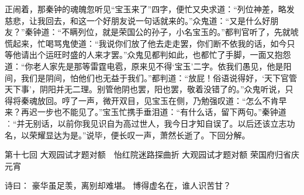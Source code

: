 \documentclass[12pt,oneside]{book}
\begin{document}
正闹着，那秦钟的魂魄忽听见“宝玉来了”四字，便忙又央求道：“列位神差，略发慈悲，让我回去，和这一个好朋友说一句话就来的。”众鬼道：“又是什么好朋友？”秦钟道：“不瞒列位，就是荣国公的孙子，小名宝玉的。”都判官听了，先就唬慌起来，忙喝骂鬼使道：“我说你们放了他去走走罢，你们断不依我的话，如今只等他请出个运旺时盛的人来才罢。”众鬼见都判如此，也都忙了手脚，一面又抱怨道：“你老人家先是那等雷霆电雹，原来见不得‘宝玉’二字。依我们愚见，他是阳间，我们是阴间，怕他们也无益于我们。”都判道：“放屁！俗语说得好，‘天下官管天下事’，阴阳并无二理。别管他阴也罢，阳也罢，敬着没错了的。”众鬼听说，只得将秦魂放回。哼了一声，微开双目，见宝玉在侧，乃勉强叹道：“怎么不肯早来？再迟一步也不能见了。”宝玉忙携手垂泪道：“有什么话，留下两句。”秦钟道︰“并无别话，以前你我见识自为高过世人，我今日才知自误了。以后还该立志功名，以荣耀显达为是。”说毕，便长叹一声，萧然长逝了。下回分解。


 
第十七回  大观园试才题对额　怡红院迷路探曲折
          大观园试才题对额  荣国府归省庆元宵

诗曰：
豪华虽足羡，离别却难堪。
博得虚名在，谁人识苦甘？
\end{document}

